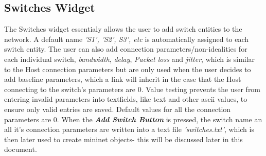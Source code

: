 \subsection{Switches Widget}
The Switches widget essentialy allows the user to add switch entities to the network. A default name \textit{'S1', 'S2', S3', etc} is automatically assigned to each switch entity. The user can also add connection parameters/non-idealities for each individual switch, \textit{bandwidth}, \textit{delay}, \textit{Packet loss} and \textit{jitter}, which is similar to the Host connection parameters but are only used when the user decides to add baseline parameters, which a link will inherit in the case that the Host connecting to the switch's parameters are 0. Value testing prevents the user from entering invalid parameters into textfields, like text and other ascii values, to ensure only valid entries are saved. Default values for all the connection parameters are 0. When the \textbf{\textit{Add Switch Button}} is pressed, the switch name an all it's connection parameters are written into a text file \textit{'switches.txt'}, which is then later used to create mininet objects- this will be discussed later in this document.\\
